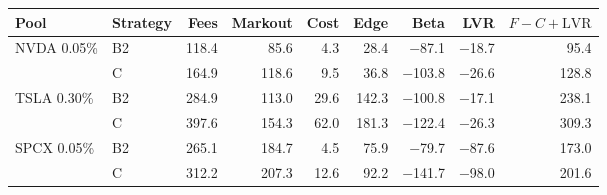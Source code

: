 \begin{tabular}{llrrrrrrr}
\toprule
Pool & Strategy & Fees & Markout & Cost & Edge & Beta & LVR & $F-C+\mathrm{LVR}$ \\
\midrule
NVDA 0.05\% & B2 & 118.4 & 85.6 & 4.3 & 28.4 & $-$87.1 & $-$18.7 & 95.4 \\
 & C & 164.9 & 118.6 & 9.5 & 36.8 & $-$103.8 & $-$26.6 & 128.8 \\
TSLA 0.30\% & B2 & 284.9 & 113.0 & 29.6 & 142.3 & $-$100.8 & $-$17.1 & 238.1 \\
 & C & 397.6 & 154.3 & 62.0 & 181.3 & $-$122.4 & $-$26.3 & 309.3 \\
SPCX 0.05\% & B2 & 265.1 & 184.7 & 4.5 & 75.9 & $-$79.7 & $-$87.6 & 173.0 \\
 & C & 312.2 & 207.3 & 12.6 & 92.2 & $-$141.7 & $-$98.0 & 201.6 \\
\bottomrule
\end{tabular}
